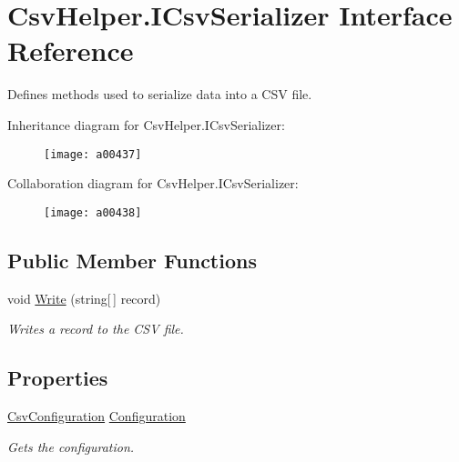 \hypertarget{a00111}{\section{Csv\-Helper.\-I\-Csv\-Serializer Interface Reference}
\label{a00111}
}


Defines methods used to serialize data into a C\-S\-V file.  




Inheritance diagram for Csv\-Helper.\-I\-Csv\-Serializer\-:
\nopagebreak
\begin{figure}[H]
\begin{center}
\leavevmode
\texttt{[image: a00437]}
\end{center}
\end{figure}


Collaboration diagram for Csv\-Helper.\-I\-Csv\-Serializer\-:
\nopagebreak
\begin{figure}[H]
\begin{center}
\leavevmode
\texttt{[image: a00438]}
\end{center}
\end{figure}
\subsection*{Public Member Functions}
\begin{DoxyCompactItemize}
\item 
void \hyperlink{a00111_a0b442858eef85b7d933662359646fd0b}{Write} (string\mbox{[}$\,$\mbox{]} record)
\begin{DoxyCompactList}\small\item\em Writes a record to the C\-S\-V file. \end{DoxyCompactList}\end{DoxyCompactItemize}
\subsection*{Properties}
\begin{DoxyCompactItemize}
\item 
\hyperlink{a00060}{Csv\-Configuration} \hyperlink{a00111_a54d241fe87517707b6f85c30fe8b3a95}{Configuration}
\begin{DoxyCompactList}\small\item\em Gets the configuration. \end{DoxyCompactList}\end{DoxyCompactItemize}


